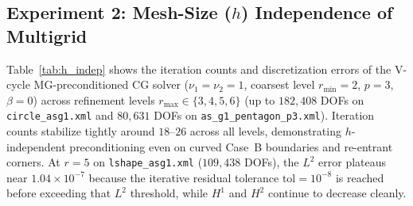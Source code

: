 \documentclass[11pt,a4paper]{article}
\begin{document}
\subsection{Experiment 2: Mesh-Size ($h$) Independence of Multigrid}
Table~\ref{tab:h_indep} shows the iteration counts and discretization errors of the V-cycle MG-preconditioned CG solver ($\nu_1=\nu_2=1$, coarsest level $r_{\min}=2$, $p=3$, $\beta=0$) across refinement levels $r_{\max} \in \{3, 4, 5, 6\}$ (up to $182{,}408$ DOFs on \texttt{circle\_asg1.xml} and $80{,}631$ DOFs on \texttt{as\_g1\_pentagon\_p3.xml}). Iteration counts stabilize tightly around $18$--$26$ across all levels, demonstrating $h$-independent preconditioning even on curved Case~B boundaries and re-entrant corners. At $r=5$ on \texttt{lshape\_asg1.xml} ($109{,}438$ DOFs), the $L^2$ error plateaus near $1.04\times 10^{-7}$ because the iterative residual tolerance $\mathrm{tol}=10^{-8}$ is reached before exceeding that $L^2$ threshold, while $H^1$ and $H^2$ continue to decrease cleanly.
\end{document}
